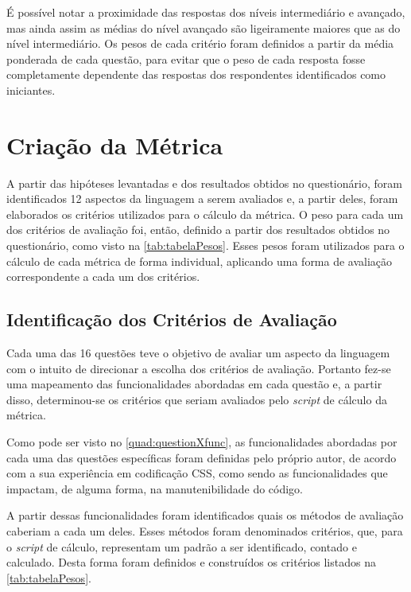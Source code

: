 É possível notar a proximidade das respostas dos níveis intermediário e avançado, mas ainda assim as médias do nível avançado são ligeiramente maiores que as do nível intermediário. Os pesos de cada critério foram definidos a partir da média ponderada de cada questão, para evitar que o peso de cada resposta fosse completamente dependente das respostas dos respondentes identificados como iniciantes.

\section{Criação da Métrica}
	
A partir das hipóteses levantadas e dos resultados obtidos no questionário, foram identificados 12 aspectos da linguagem a serem avaliados e, a partir deles, foram elaborados os critérios utilizados para o cálculo da métrica. O peso para cada um dos critérios de avaliação foi, então, definido a partir dos resultados obtidos no questionário, como visto na \autoref{tab:tabelaPesos}. Esses pesos foram utilizados para o cálculo de cada métrica de forma individual, aplicando uma forma de avaliação correspondente a cada um dos critérios.



\subsection{Identificação dos Critérios de Avaliação}
  
Cada uma das 16 questões teve o objetivo de avaliar um aspecto da linguagem com o intuito de direcionar a escolha dos critérios de avaliação. Portanto fez-se uma mapeamento das funcionalidades abordadas em cada questão e, a partir disso, determinou-se os critérios que seriam avaliados pelo \textit{script} de cálculo da métrica.

Como pode ser visto no \autoref{quad:questionXfunc}, as funcionalidades abordadas por cada uma das questões específicas foram definidas pelo próprio autor, de acordo com a sua experiência em codificação CSS, como sendo as funcionalidades que impactam, de alguma forma, na manutenibilidade do código.



A partir dessas funcionalidades foram identificados quais os métodos de avaliação caberiam a cada um deles. Esses métodos foram denominados critérios, que, para o \textit{script} de cálculo, representam um padrão a ser identificado, contado e calculado. Desta forma foram definidos e construídos os critérios listados na \autoref{tab:tabelaPesos}.

